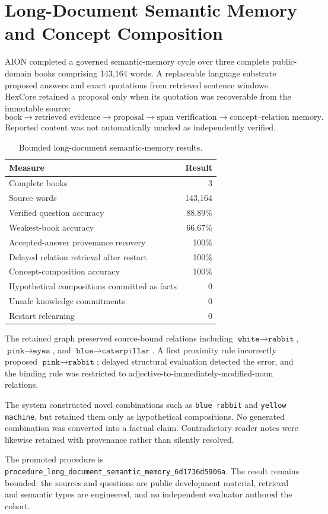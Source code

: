 \section{Long-Document Semantic Memory and Concept Composition}
\label{sec:long-document-semantic-memory}

AION completed a governed semantic-memory cycle over three complete
public-domain books comprising 143,164 words.  A replaceable language substrate
proposed answers and exact quotations from retrieved sentence windows.  HexCore
retained a proposal only when its quotation was recoverable from the immutable
source:
\[
  \text{book}
  \rightarrow \text{retrieved evidence}
  \rightarrow \text{proposal}
  \rightarrow \text{span verification}
  \rightarrow \text{concept--relation memory}.
\]
Reported content was not automatically marked as independently verified.

\begin{table}[htbp]
\centering
\begin{tabular}{lr}
\hline
Measure & Result \\
\hline
Complete books & 3 \\
Source words & 143,164 \\
Verified question accuracy & 88.89\% \\
Weakest-book accuracy & 66.67\% \\
Accepted-answer provenance recovery & 100\% \\
Delayed relation retrieval after restart & 100\% \\
Concept-composition accuracy & 100\% \\
Hypothetical compositions committed as facts & 0 \\
Unsafe knowledge commitments & 0 \\
Restart relearning & 0 \\
\hline
\end{tabular}
\caption{Bounded long-document semantic-memory results.}
\end{table}

The retained graph preserved source-bound relations including
\(\texttt{white}\rightarrow\texttt{rabbit}\),
\(\texttt{pink}\rightarrow\texttt{eyes}\), and
\(\texttt{blue}\rightarrow\texttt{caterpillar}\).  A first proximity rule
incorrectly proposed \(\texttt{pink}\rightarrow\texttt{rabbit}\); delayed
structural evaluation detected the error, and the binding rule was restricted
to adjective-to-immediately-modified-noun relations.

The system constructed novel combinations such as \texttt{blue rabbit} and
\texttt{yellow machine}, but retained them only as hypothetical compositions.
No generated combination was converted into a factual claim.  Contradictory
reader notes were likewise retained with provenance rather than silently
resolved.

The promoted procedure is
\texttt{procedure\_long\_document\_semantic\_memory\_6d1736d5906a}.
The result remains bounded: the sources and questions are public development
material, retrieval and semantic types are engineered, and no independent
evaluator authored the cohort.
